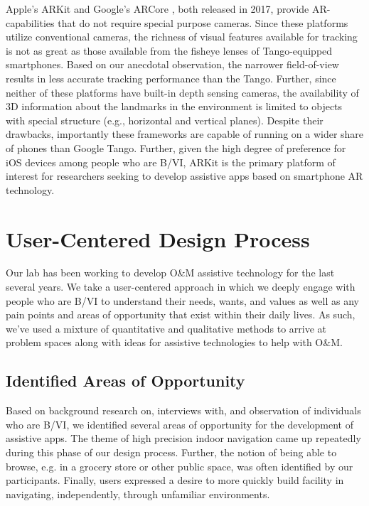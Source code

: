 \documentclass[chi_draft]{sigchi}
\newcommand{\BVI}{B/VI\xspace}
\newcommand{\OM}{O\&M\xspace}
\begin{document}
Apple's ARKit \cite{arkit} and Google's ARCore \cite{arcore}, both released in 2017, provide AR-capabilities that do not require special purpose cameras.  Since these platforms utilize conventional cameras, the richness of visual features available for tracking is not as great as those available from the fisheye lenses of Tango-equipped smartphones.  Based on our anecdotal observation, the narrower field-of-view results in less accurate tracking performance than the Tango.  Further, since neither of these platforms have built-in depth sensing cameras, the availability of 3D information about the landmarks in the environment is limited to objects with special structure (e.g., horizontal and vertical planes).  Despite their drawbacks, importantly these frameworks are capable of running on a wider share of phones than Google Tango.  Further, given the high degree of preference for iOS devices among people who are \BVI \cite{morris2014blind}, ARKit is the primary platform of interest for researchers seeking to develop assistive apps based on smartphone AR technology.

\section{User-Centered Design Process}
Our lab has been working to develop \OM assistive technology for the last several years.  We take a user-centered approach in which we deeply engage with people who are \BVI to understand their needs, wants, and values as well as any pain points and areas of opportunity that exist within their daily lives.  As such, we've used a mixture of quantitative and qualitative methods to arrive at problem spaces along with ideas for assistive technologies to help with \OM.

\subsection{Identified Areas of Opportunity}
Based on background research on, interviews with, and observation of individuals who are \BVI, we identified several areas of opportunity for the development of assistive apps.  The theme of high precision  indoor navigation came up repeatedly during this phase of our design process.  Further, the notion of being able to browse, e.g. in a grocery store or other public space, was often identified by our participants.  Finally, users expressed a desire to more quickly build facility in navigating, independently, through unfamiliar environments.
\end{document}
